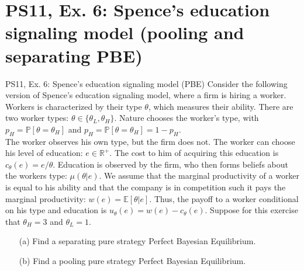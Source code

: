 \section{PS11, Ex. 6: Spence’s education signaling model (pooling and separating PBE)}

\begin{frame}{PS11, Ex. 6: Spence’s education signaling model (PBE)}
    Consider the following version of Spence’s education signaling model, where a firm is hiring a worker. Workers is characterized by their type $\theta$, which measures their ability. There are two worker types: $\theta\in\{\theta_L,\theta_H\}$. Nature chooses the worker’s type, with $p_H=\mathbb{P}[\theta=\theta_H]$ and $p_H=\mathbb{P}[\theta=\theta_H]=1-p_H$.\\\smallskip
    The worker observes his own type, but the firm does not. The worker can choose his level of education: $e\in\mathbb{R}^{+}$. The cost to him of acquiring this education is $c_\theta(e)=e/\theta$. Education is observed by the firm, who then forms beliefs about the workers type: $\mu(\theta|e)$. We assume that the marginal productivity of a worker is equal to his ability and that the company is in competition such it pays the marginal productivity: $w(e)=\mathbb{E}[\theta|e]$. Thus, the payoff to a worker conditional on his type and education is $u_\theta(e)=w(e)-c_\theta(e)$. Suppose for this exercise that $\theta_H=3$ and $\theta_L=1$.\vspace{-4pt}
    \begin{itemize}
      \item[(a)] Find a separating pure strategy Perfect Bayesian Equilibrium.
      \item[(b)] Find a pooling pure strategy Perfect Bayesian Equilibrium.
    \end{itemize}
    \vfill\null
\end{frame}
